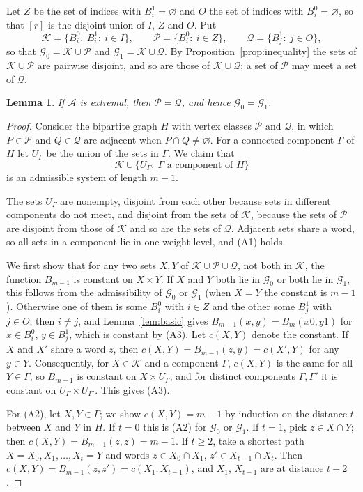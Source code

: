 \documentclass[11pt]{amsart}
\newtheorem{lemma}[theorem]{Lemma}
\theoremstyle{definition}
\theoremstyle{remark}
\numberwithin{equation}{section}
\newcommand{\cA}{\mathcal{A}}
\newcommand{\cG}{\mathcal{G}}
\newcommand{\cK}{\mathcal{K}}
\newcommand{\cP}{\mathcal{P}}
\newcommand{\cQ}{\mathcal{Q}}
\begin{document}
Let $Z$ be the set of indices with $B_i^1=\varnothing$ and $O$ the set of indices with $B_i^0=\varnothing$, so that $[r]$ is the disjoint union of $I$, $Z$ and $O$. Put
\[
\cK=\{B_i^0,\ B_i^1:\ i\in I\},\qquad \cP=\{B_i^0:\ i\in Z\},\qquad \cQ=\{B_j^1:\ j\in O\},
\]
so that $\cG_0=\cK\cup\cP$ and $\cG_1=\cK\cup\cQ$. By Proposition~\ref{prop:inequality} the sets of $\cK\cup\cP$ are pairwise disjoint, and so are those of $\cK\cup\cQ$; a set of $\cP$ may meet a set of $\cQ$.

\begin{lemma}\label{lem:merge}
If $\cA$ is extremal, then $\cP=\cQ$, and hence $\cG_0=\cG_1$.
\end{lemma}

\begin{proof}
Consider the bipartite graph $H$ with vertex classes $\cP$ and $\cQ$, in which $P\in\cP$ and $Q\in\cQ$ are adjacent when $P\cap Q\ne\varnothing$. For a connected component $\Gamma$ of $H$ let $U_\Gamma$ be the union of the sets in $\Gamma$. We claim that
\[
\cK\cup\{U_\Gamma:\ \Gamma\text{ a component of }H\}
\]
is an admissible system of length $m-1$.

The sets $U_\Gamma$ are nonempty, disjoint from each other because sets in different components do not meet, and disjoint from the sets of $\cK$, because the sets of $\cP$ are disjoint from those of $\cK$ and so are the sets of $\cQ$. Adjacent sets share a word, so all sets in a component lie in one weight level, and (A1) holds.

We first show that for any two sets $X,Y$ of $\cK\cup\cP\cup\cQ$, not both in $\cK$, the function $B_{m-1}$ is constant on $X\times Y$. If $X$ and $Y$ both lie in $\cG_0$ or both lie in $\cG_1$, this follows from the admissibility of $\cG_0$ or $\cG_1$ (when $X=Y$ the constant is $m-1$). Otherwise one of them is some $B_i^0$ with $i\in Z$ and the other some $B_j^1$ with $j\in O$; then $i\ne j$, and Lemma~\ref{lem:basic} gives $B_{m-1}(x,y)=B_m(x0,y1)$ for $x\in B_i^0$, $y\in B_j^1$, which is constant by (A3). Let $c(X,Y)$ denote the constant. If $X$ and $X'$ share a word $z$, then $c(X,Y)=B_{m-1}(z,y)=c(X',Y)$ for any $y\in Y$. Consequently, for $X\in\cK$ and a component $\Gamma$, $c(X,Y)$ is the same for all $Y\in\Gamma$, so $B_{m-1}$ is constant on $X\times U_\Gamma$; and for distinct components $\Gamma,\Gamma'$ it is constant on $U_\Gamma\times U_{\Gamma'}$. This gives (A3).

For (A2), let $X,Y\in\Gamma$; we show $c(X,Y)=m-1$ by induction on the distance $t$ between $X$ and $Y$ in $H$. If $t=0$ this is (A2) for $\cG_0$ or $\cG_1$. If $t=1$, pick $z\in X\cap Y$; then $c(X,Y)=B_{m-1}(z,z)=m-1$. If $t\ge2$, take a shortest path $X=X_0,X_1,\dots,X_t=Y$ and words $z\in X_0\cap X_1$, $z'\in X_{t-1}\cap X_t$. Then $c(X,Y)=B_{m-1}(z,z')=c(X_1,X_{t-1})$, and $X_1$, $X_{t-1}$ are at distance $t-2$.


\end{proof}
\end{document}
